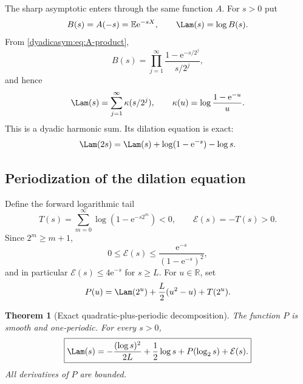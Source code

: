 \documentclass[11pt,oneside]{article}
\newtheorem{theorem}{Theorem}[section]
\theoremstyle{definition}
\theoremstyle{remark}
\newcommand{\R}{\mathbb R}
\newcommand{\e}{\mathrm e}
\newcommand{\E}{\mathbb E}
\begin{document}
The sharp asymptotic enters through the same function $A$.  For $s>0$ put
\begin{equation}
 B(s)=A(-s)=\E\e^{-sX},
 \qquad
 \Lam(s)=\log B(s).                                         \label{dyadicasym:eq:B-Lambda}
\end{equation}
From \eqref{dyadicasym:eq:A-product},
\begin{equation}
 B(s)=\prod_{j=1}^{\infty}
 \frac{1-\e^{-s/2^j}}{s/2^j},                               \label{dyadicasym:eq:B-product}
\end{equation}
and hence
\begin{equation}
 \Lam(s)=\sum_{j=1}^{\infty}\kappa(s/2^j),
 \qquad
 \kappa(u)=\log\frac{1-\e^{-u}}u.                          \label{dyadicasym:eq:Lambda-harmonic}
\end{equation}
This is a dyadic harmonic sum.  Its dilation equation is exact:
\begin{equation}
 \Lam(2s)=\Lam(s)+\log(1-\e^{-s})-\log s.                  \label{dyadicasym:eq:Lambda-dilation}
\end{equation}

\subsection{Periodization of the dilation equation}

Define the forward logarithmic tail
\begin{equation}
 T(s)=\sum_{m=0}^{\infty}\log(1-\e^{-s2^m})<0,
 \qquad
 \mathcal E(s)=-T(s)>0.                                    \label{dyadicasym:eq:tail}
\end{equation}
Since $2^m\ge m+1$,
\begin{equation}
 0\le\mathcal E(s)\le
 \frac{\e^{-s}}{(1-\e^{-s})^2},                            \label{dyadicasym:eq:tail-bound-report}
\end{equation}
and in particular $\mathcal E(s)\le4\e^{-s}$ for $s\ge L$.
For $u\in\R$, set
\begin{equation}
 P(u)=\Lam(2^u)+\frac L2(u^2-u)+T(2^u).                    \label{dyadicasym:eq:P-report}
\end{equation}

\begin{theorem}[Exact quadratic-plus-periodic decomposition]
\label{dyadicasym:thm:periodic-decomposition}
The function $P$ is smooth and one-periodic.  For every $s>0$,
\begin{equation}
 \boxed{
 \Lam(s)=-\frac{(\log s)^2}{2L}+\frac12\log s
 +P(\log_2s)+\mathcal E(s).}                               \label{dyadicasym:eq:Lambda-periodic}
\end{equation}
All derivatives of $P$ are bounded.
\end{theorem}
\end{document}
